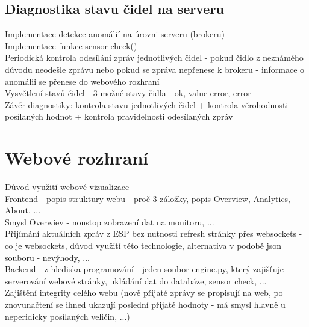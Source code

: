 \section{Diagnostika stavu čidel na serveru} \label{sec:example_xor}

Implementace detekce anomálií na úrovni serveru (brokeru) \\
Implementace funkce sensor-check() \\
Periodická kontrola odesílání zpráv jednotlivých čidel - pokud čidlo z neznámého důvodu neodešle zprávu nebo pokud se zpráva nepřenese k brokeru - informace o anomálii se přenese do webového rozhraní \\
Vysvětlení stavů čidel - 3 možné stavy čidla - ok, value-error, error \\

Závěr diagnostiky: kontrola stavu jednotlivých čidel + kontrola věrohodnosti posílaných hodnot + kontrola pravidelnosti odesílaných zpráv


\chapter{Webové rozhraní} \label{chap:methods}

Důvod využití webové vizualizace \\ 
Frontend - popis struktury webu - proč 3 záložky, popis Overview, Analytics, About, ... \\
Smysl Overwiev - nonstop zobrazení dat na monitoru, ... \\
Přijímání aktuálních zpráv z ESP bez nutnosti refresh stránky přes websockets - co je websockets, důvod využití této technologie, alternativa v podobě json souboru - nevýhody, ... \\
Backend - z hlediska programování - jeden soubor engine.py, který zajišťuje serverování webové stránky, ukládání dat do databáze, sensor check, ... \\

Zajištění integrity celého webu (nově přijaté zprávy se propisují na web, po znovunačtení se ihned ukazují poslední přijaté hodnoty - má smysl hlavně u neperidicky posílaných veličin, ...) \\




